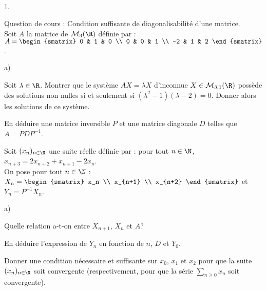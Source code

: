 \documentclass[11pt]{article}%
\begin{document}
\begin{exerciceAP}~
  \begin{noliste}{1.}
    \setlength{\itemsep}{2mm}
  \item Question de cours : Condition suffisante de diagonalisabilité
    d'une matrice.\\

    Soit $A$ la matrice de $\mathcal{M}_3 (\R)$ définie par : $A
    = 
    \begin{smatrix} 
      0 & 1 & 0 \\ 
      0 & 0 & 1 \\ 
      -2 & 1 & 2
    \end{smatrix}$.

  \item 
    \begin{noliste}{a)}
    \setlength{\itemsep}{2mm}
    \item Soit $\lambda \in \R$. Montrer que le système $A X = \lambda
      X$ d'inconnue $X \in \mathcal{M}_{3,1} (\R)$ possède des
      solutions non nulles si et seulement si $(\lambda^2-1) (\lambda
      -2) = 0$. Donner alors les solutions de ce système.

    \item En déduire une matrice inversible $P$ et une matrice
      diagonale $D$ telles que $A = P D P^{-1}$.
    \end{noliste}

  \item Soit $(x_n)_{ n \in \N}$ une suite réelle définie par : pour
    tout $n \in \N$, $x_{n+3} = 2 x_{n+2} + x_{n+1} - 2 x_n$.\\

    On pose pour tout $n \in \N$ : $X_n = 
    \begin{smatrix} 
      x_n \\
      x_{n+1} \\ 
      x_{n+2} 
    \end{smatrix}$ et $Y_n = P^{-1} X_n$.
    \begin{noliste}{a)}
    \setlength{\itemsep}{2mm}
    \item Quelle relation a-t-on entre $X_{n+1}$, $X_n$ et $A$?
    \item En déduire l'expression de $Y_n$ en fonction de $n$, $D$ et
      $Y_0$.
    \item Donner une condition nécessaire et suffisante sur $x_0$,
      $x_1$ et $x_2$ pour que la suite $(x_n)_{n \in \N}$ soit
      convergente (respectivement, pour que la série $\sum\limits_{ n
        \geq 0 } x_n$ soit convergente).
    \end{noliste}


\end{noliste}
\end{exerciceAP}
\end{document}
